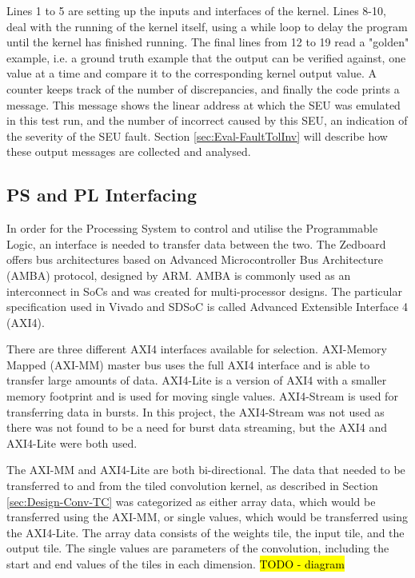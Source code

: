 \documentclass[12pt]{article}
\begin{document}
Lines 1 to 5 are setting up the inputs and interfaces of the kernel. Lines 8-10, deal with the running of the kernel itself, using a while loop to delay the program until the kernel has finished running. The final lines from 12 to 19 read a "golden" example, i.e. a ground truth example that the output can be verified against, one value at a time and compare it to the corresponding kernel output value. A counter keeps track of the number of discrepancies, and finally the code prints a message. This message shows the linear address at which the SEU was emulated in this test run, and the number of incorrect caused by this SEU, an indication of the severity of the SEU fault. Section \ref{sec:Eval-FaultTolInv} will describe how these output messages are collected and analysed.


\subsection{PS and PL Interfacing}
\label{sec:Design-PSnPL}

In order for the Processing System to control and utilise the Programmable Logic, an interface is needed to transfer data between the two. The Zedboard offers bus architectures based on Advanced Microcontroller Bus Architecture (AMBA) protocol, designed by ARM. AMBA is commonly used as an interconnect in SoCs and was created for multi-processor designs. The particular specification used in Vivado and SDSoC is called Advanced Extensible Interface 4 (AXI4). 

There are three different AXI4 interfaces available for selection. AXI-Memory Mapped (AXI-MM) master bus uses the full AXI4 interface and is able to transfer large amounts of data. AXI4-Lite is a version of AXI4 with a smaller memory footprint and is used for moving single values. AXI4-Stream is used for transferring data in bursts. In this project, the AXI4-Stream was not used as there was not found to be a need for burst data streaming, but the AXI4 and AXI4-Lite were both used. 

The AXI-MM and AXI4-Lite are both bi-directional. The data that needed to be transferred to and from the tiled convolution kernel, as described in Section \ref{sec:Design-Conv-TC} was categorized as either array data, which would be transferred using the AXI-MM, or single values, which would be transferred using the AXI4-Lite. The array data consists of the weights tile, the input tile, and the output tile. The single values are parameters of the convolution, including the start and end values of the tiles in each dimension. \hl{TODO - diagram}
\end{document}
